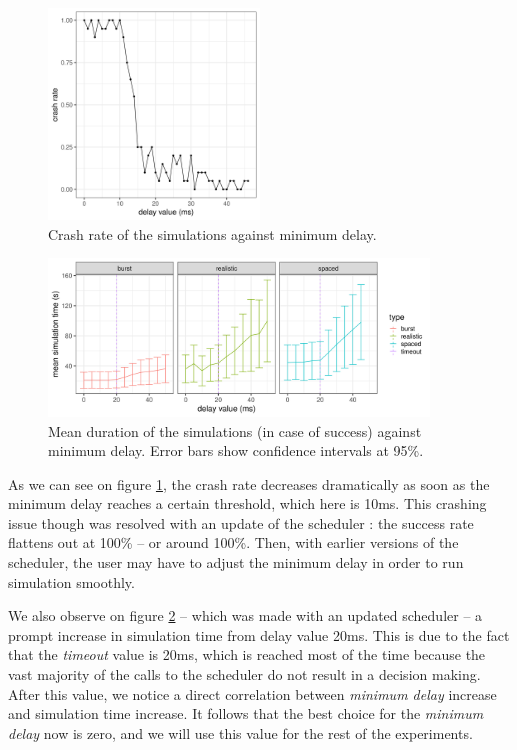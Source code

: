 \begin{figure}
	\centering
	\includegraphics[width=0.5\textwidth]{../imgs/min-delay_crash_old.png}
	\caption{Crash rate of the simulations against minimum delay.}
	\label{fig:min-delay_crash}
\end{figure}

\begin{figure}
	\centering
	\includegraphics[width=0.9\textwidth]{../imgs/min-delay_duration.png}
	\caption{Mean duration of the simulations (in case of success) against minimum delay. Error bars show confidence intervals at 95\%.}
	\label{fig:min-delay_duration}
\end{figure}

As we can see on figure \ref{fig:min-delay_crash}, the crash rate decreases
dramatically as soon as the minimum delay reaches a certain threshold, which
here is 10ms.  This crashing issue though was resolved with an update of the
scheduler : the success rate flattens out at 100\% -- or around 100\%. Then,
with earlier versions of the scheduler, the user may have to adjust the minimum
delay in order to run simulation smoothly. 

We also observe on figure \ref{fig:min-delay_duration} -- which was made with
an updated scheduler -- a prompt increase in simulation time from delay value
20ms. This is due to the fact that the \textit{timeout} value is 20ms, which is
reached most of the time because the vast majority of the calls to the
scheduler do not result in a decision making. After this value, we notice a
direct correlation between \textit{minimum delay} increase and simulation time
increase. It follows that the best choice for the \textit{minimum delay} now is
zero, and we will use this value for the rest of the experiments.

